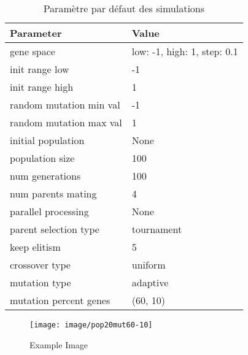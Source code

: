 \documentclass[journal, a4paper]{IEEEtran}
\begin{document}
	\begin{table}[!hbt]
		\begin{center}
		\caption{Paramètre par défaut des simulations}
		\label{tab:simParameters}
		\begin{tabular}{|l|l|}
			\hline
			\textbf{Parameter} & \textbf{Value} \\
			\hline
			gene space & {low: -1, high: 1, step: 0.1} \\
			\hline
			init range low & -1 \\
			\hline
			init range high & 1 \\
			\hline
			random mutation min val & -1 \\
			\hline
			random mutation max val & 1 \\
			\hline
			initial population & None \\
			\hline
			population size & 100 \\
			\hline
			num generations & 100 \\
			\hline
			num parents mating & 4 \\
			\hline
			parallel processing & None \\
			\hline
			parent selection type & tournament \\
			\hline
			keep elitism & 5 \\
			\hline
			crossover type & uniform \\
			\hline
			mutation type & adaptive \\
			\hline
			mutation percent genes & (60, 10) \\
			\hline
			\end{tabular}
		\end{center}
	\end{table}
	\begin{figure}
	  \centering
	  \texttt{[image: image/pop20mut60-10]}
	  \caption{Example Image}
	  \label{fig:example}
	\end{figure}
\end{document}

